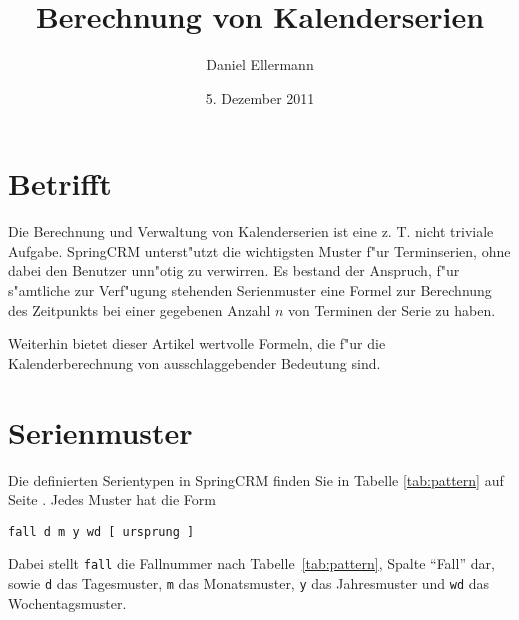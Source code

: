 \documentclass[a4paper]{article}
\title{Berechnung von Kalenderserien}
\author{Daniel Ellermann}
\date{5. Dezember 2011}
\numberwithin{equation}{section}
\begin{document}
\maketitle
\tableofcontents



%
%
%
%
\section{Betrifft}
Die Berechnung und Verwaltung von Kalenderserien ist eine z. T. nicht triviale
Aufgabe. SpringCRM unterst"utzt die wichtigsten Muster f"ur Terminserien, ohne
dabei den Benutzer unn"otig zu verwirren. Es bestand der Anspruch, f"ur
s"amtliche zur Verf"ugung stehenden Serienmuster eine Formel zur Berechnung
des Zeitpunkts bei einer gegebenen Anzahl $n$ von Terminen der Serie zu haben.

Weiterhin bietet dieser Artikel wertvolle Formeln, die f"ur die
Kalenderberechnung von ausschlaggebender Bedeutung sind.



%
%
%
%
\section{Serienmuster}
Die definierten Serientypen in SpringCRM finden Sie in Tabelle
\ref{tab:pattern} auf Seite \pageref{tab:pattern}. Jedes Muster hat die Form

\vspace{8pt}
\texttt{fall d m y wd [ ursprung ]}
\vspace{8pt}

\noindent Dabei stellt \texttt{fall} die Fallnummer nach
Tabelle~\ref{tab:pattern}, Spalte "`Fall"' dar, sowie \texttt{d} das
Tagesmuster, \texttt{m} das Monatsmuster, \texttt{y} das Jahresmuster und
\texttt{wd} das Wochentagsmuster.
\end{document}
